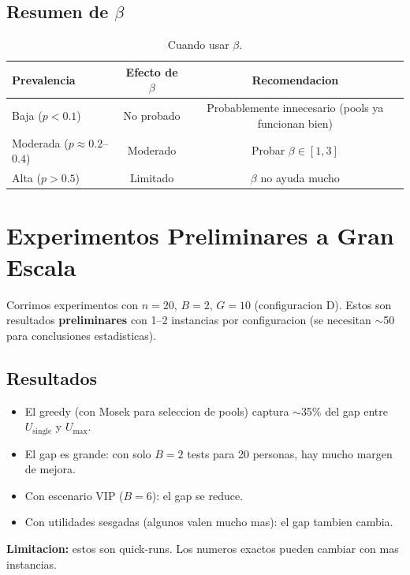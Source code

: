 \documentclass[11pt]{article}
\begin{document}
\subsection{Resumen de $\beta$}

\begin{table}[htbp]
  \centering
  \begin{tabular}{lcc}
    \toprule
    Prevalencia & Efecto de $\beta$ & Recomendacion \\
    \midrule
    Baja ($p < 0.1$) & No probado & Probablemente innecesario (pools ya funcionan bien) \\
    Moderada ($p \approx 0.2$--$0.4$) & Moderado & Probar $\beta \in [1, 3]$ \\
    Alta ($p > 0.5$) & Limitado & $\beta$ no ayuda mucho \\
    \bottomrule
  \end{tabular}
  \caption{Cuando usar $\beta$.}
\end{table}

\section{Experimentos Preliminares a Gran Escala}

Corrimos experimentos con $n=20$, $B=2$, $G=10$ (configuracion D).
Estos son resultados \textbf{preliminares} con 1--2 instancias por configuracion
(se necesitan $\sim$50 para conclusiones estadisticas).

\subsection{Resultados}

\begin{itemize}
  \item El greedy (con Mosek para seleccion de pools) captura $\sim$35\% del
        gap entre $U_{\text{single}}$ y $U_{\max}$.
  \item El gap es grande: con solo $B=2$ tests para 20 personas,
        hay mucho margen de mejora.
  \item Con escenario VIP ($B=6$): el gap se reduce.
  \item Con utilidades sesgadas (algunos valen mucho mas): el gap tambien cambia.
\end{itemize}

\textbf{Limitacion:} estos son quick-runs. Los numeros exactos pueden cambiar
con mas instancias.
\end{document}
